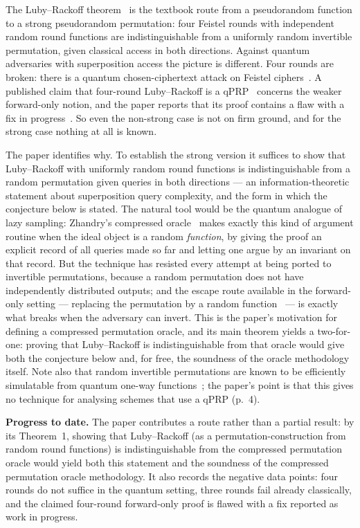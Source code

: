 \documentclass{aicr-conjecture}
\begin{document}
The Luby--Rackoff theorem~\cite{LR88} is the textbook route from a
pseudorandom function to a strong pseudorandom permutation: four
Feistel rounds with independent random round functions are
indistinguishable from a uniformly random invertible permutation,
given classical access in both directions. Against quantum adversaries
with superposition access the picture is different. Four rounds are
broken: there is a quantum chosen-ciphertext attack on Feistel
ciphers~\cite{IHMSI19}. A published claim that four-round
Luby--Rackoff is a qPRP~\cite{HI19} concerns the weaker forward-only
notion, and the paper reports that its proof contains a flaw with a
fix in progress~\cite{HI21}. So even the non-strong case is not on
firm ground, and for the strong case nothing at all is known.

The paper identifies why. To establish the strong version it suffices
to show that Luby--Rackoff with uniformly random round functions is
indistinguishable from a random permutation given queries in both
directions --- an information-theoretic statement about superposition
query complexity, and the form in which the conjecture below is
stated. The natural tool would be the quantum analogue of lazy
sampling: Zhandry's compressed oracle~\cite{Zha19} makes exactly this
kind of argument routine when the ideal object is a random
\emph{function}, by giving the proof an explicit record of all queries
made so far and letting one argue by an invariant on that record. But
the technique has resisted every attempt at being ported to invertible
permutations, because a random permutation does not have independently
distributed outputs; and the escape route available in the
forward-only setting --- replacing the permutation by a random
function~\cite{Zha15} --- is exactly what breaks when the adversary
can invert. This is the paper's motivation for defining a compressed
permutation oracle, and its main theorem yields a two-for-one: proving
that Luby--Rackoff is indistinguishable from that oracle would give
both the conjecture below and, for free, the soundness of the oracle
methodology itself. Note also that random invertible permutations are
known to be efficiently simulatable from quantum one-way
functions~\cite{Zha16}; the paper's point is that this gives no
technique for analysing schemes that use a qPRP (p.~4).

\textbf{Progress to date.} The paper contributes a route rather than a
partial result: by its Theorem~1, showing that Luby--Rackoff (as a
permutation-construction from random round functions) is
indistinguishable from the compressed permutation oracle would yield
both this statement and the soundness of the compressed permutation
oracle methodology. It also records the negative data points: four
rounds do not suffice in the quantum setting, three rounds fail
already classically, and the claimed four-round forward-only proof is
flawed with a fix reported as work in progress.
\end{document}
